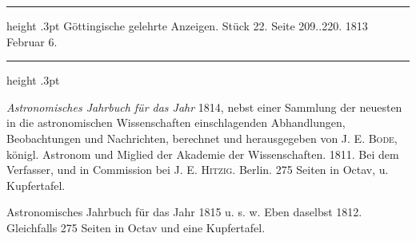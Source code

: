 \par\bigskip
\hypertarget{native-553-lower}{}\label{native-553-lower}
\begin{center}
\parbox{.79\linewidth}{%
\centering\small
\hrule height .3pt\relax\vspace{2.5pt}
Göttingische gelehrte Anzeigen. Stück 22. Seite 209..220. 1813 Februar 6.\par
\vspace{2.5pt}\hrule height .3pt\relax
}
\end{center}

\emph{Astronomisches Jahrbuch für das Jahr} 1814, nebst einer Sammlung der neuesten in die astronomischen Wissenschaften einschlagenden Abhandlungen, Beobachtungen und Nachrichten, berechnet und herausgegeben von J. E. \textsc{Bode}, königl. Astronom und Miglied der Akademie der Wissenschaften. 1811. Bei dem Verfasser, und in Commission bei J. E. \textsc{Hitzig}. Berlin. 275 Seiten in Octav, u. Kupfertafel.

Astronomisches Jahrbuch für das Jahr 1815 u. s. w. Eben daselbst 1812. Gleichfalls 275 Seiten in Octav und eine Kupfertafel.


